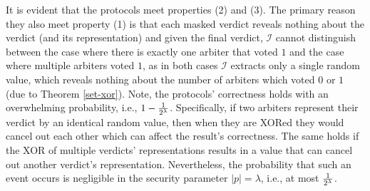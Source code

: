 It is evident that the protocols meet properties (2) and (3). The primary reason they also meet  property (1) is that each masked verdict reveals nothing about the verdict (and its representation) and  given the final verdict, $\mathcal{I}$ cannot distinguish between the case where there is exactly one arbiter that voted  $1$ and the case where multiple arbiters voted $1$, as in both cases $\mathcal{I}$   extracts only a single random value, which reveals nothing about the number of arbiters which voted $0$ or $1$ (due to Theorem \ref{set-xor}).   Note,  the protocols' correctness holds with an overwhelming probability, i.e., $1-\frac{1}{2^{\scriptscriptstyle \lambda}}$. Specifically, if two arbiters  represent their verdict by an identical random value, then when they are XORed they would cancel out each other which can affect the result's correctness. The same holds if the XOR of  multiple verdicts' representations results in a value that can cancel out another verdict's representation. Nevertheless, the probability that such an event occurs is negligible in the security parameter $|p|=\lambda$, i.e., at most   $\frac{1}{2^{\scriptscriptstyle \lambda}}$. %
 
 

 
 





